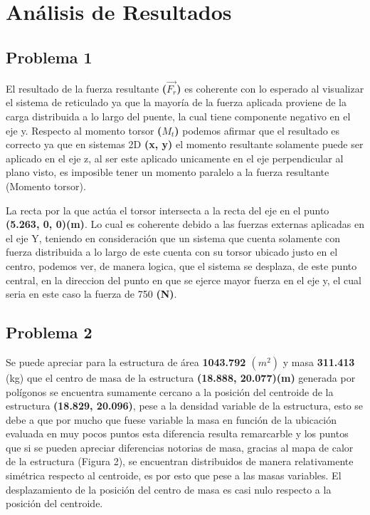 \documentclass[]{article}
\begin{document}
\section{Análisis de Resultados}
\subsection{Problema 1}
El resultado de la fuerza resultante \textbf{($\vec{F_r}$)} es coherente con lo esperado al visualizar el sistema de reticulado ya que la mayoría de la fuerza aplicada proviene de la carga distribuida a lo largo del puente, la cual tiene componente negativo en el eje y. Respecto al momento torsor \textbf{($M_t$)} podemos afirmar que el resultado es correcto ya que en sistemas 2D \textbf{(x, y)} el momento resultante solamente puede ser aplicado en el eje z, al ser este aplicado unicamente en el eje perpendicular al plano visto, es imposible tener un momento paralelo a la fuerza resultante (Momento torsor).

La recta por la que actúa el torsor intersecta a la recta del eje  en el punto \textbf{(5.263, 0, 0)(m)}. Lo cual es coherente debido a las fuerzas externas aplicadas en el eje Y, teniendo en consideración que un sistema que cuenta solamente con fuerza distribuida a lo largo de este cuenta con su torsor ubicado justo en el centro, podemos ver, de manera logica, que el sistema se desplaza, de este punto central, en la direccion del punto en que se ejerce mayor fuerza en el eje y, el cual seria en este caso la fuerza de 750 \textbf{(N)}.

\subsection{Problema 2}
Se puede apreciar para la estructura de área \textbf{1043.792 $(m^2)$} y masa \textbf{311.413} (kg) que el centro de masa de la estructura \textbf{(18.888, 20.077)(m)} generada por polígonos se encuentra sumamente cercano a la posición del centroide de la estructura \textbf{(18.829, 20.096)}, pese a la densidad variable de la estructura, esto se debe a que por mucho que fuese variable la masa en función de la ubicación evaluada en muy pocos puntos esta diferencia resulta remarcarble y los puntos que si se pueden apreciar diferencias notorias de masa, gracias al mapa de calor de la estructura (Figura 2), se encuentran distribuidos de manera relativamente simétrica respecto al centroide, es por esto que pese a las masas variables. El desplazamiento de la posición del centro de masa es casi nulo respecto a la posición del centroide.
\end{document}
